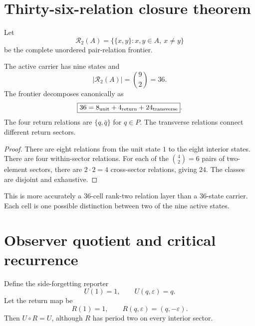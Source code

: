 \documentclass[11pt,a4paper]{article}
\begin{document}
\section{Thirty-six-relation closure theorem}
Let
\begin{equation}
\mathcal R_2(A)=\{\{x,y\}:x,y\in A,\ x\ne y\}
\end{equation}
be the complete unordered pair-relation frontier.

\begin{theorem}
The active carrier has nine states and
\begin{equation}
|\mathcal R_2(A)|=\binom92=36.
\end{equation}
The frontier decomposes canonically as
\begin{equation}
\boxed{36=8_{\rm unit}+4_{\rm return}+24_{\rm transverse}}.
\end{equation}
The four return relations are $\{q,\bar q\}$ for $q\in P$. The transverse relations connect different return sectors.
\end{theorem}
\begin{proof}
There are eight relations from the unit state $1$ to the eight interior states. There are four within-sector relations. For each of the $\binom42=6$ pairs of two-element sectors, there are $2\cdot2=4$ cross-sector relations, giving $24$. The classes are disjoint and exhaustive.
\end{proof}

This is more accurately a 36-cell rank-two relation layer than a 36-state carrier. Each cell is one possible distinction between two of the nine active states.

\section{Observer quotient and critical recurrence}
Define the side-forgetting reporter
\begin{equation}
U(1)=1,\qquad U(q,\varepsilon)=q.
\end{equation}
Let the return map be
\begin{equation}
R(1)=1,\qquad R(q,\varepsilon)=(q,-\varepsilon).
\end{equation}
Then $U\circ R=U$, although $R$ has period two on every interior sector.
\end{document}
